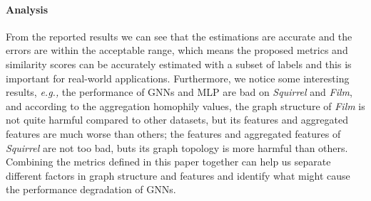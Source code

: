 \documentclass{article}
\newcommand\eg{\textit{e.g.,}}
\newcommand{\0}{{\boldsymbol{0}}}
\newcommand{\6}{{\partial}}
\newcommand{\8}{{\infty}}
\newcommand{\4}{{\nabla}}
\begin{document}
\paragraph{Analysis}
From the reported results we can see that the estimations are accurate and the errors are within the acceptable range, which means the proposed metrics and similarity scores can be accurately estimated with a subset of labels and this is important for real-world applications. Furthermore, we notice some interesting results, \eg{} the performance of GNNs and MLP are bad on \textit{Squirrel} and \textit{Film}, and according to the aggregation homophily values, the graph structure of \textit{Film} is not quite harmful compared to other datasets, but its features and aggregated features are much worse than others; the features and aggregated features of \textit{Squirrel} are not too bad, buts its graph topology is more harmful than others. Combining the metrics defined in this paper together can help us separate different factors in graph structure and features and identify what might cause the performance degradation of GNNs.
\end{document}
